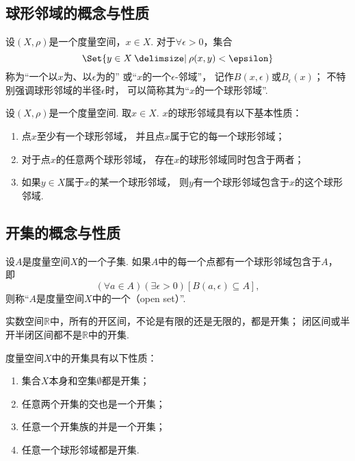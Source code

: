 \subsection{球形邻域的概念与性质}
\begin{definition}\label{definition:度量空间.球形邻域的概念}
设\((X,\rho)\)是一个度量空间，\(x \in X\).
对于\(\forall\epsilon>0\)，集合\[
	\Set{ y \in X \given \rho(x,y) < \epsilon }
\]
称为“一个以\(x\)为、以\(\epsilon\)为的”
或“\(x\)的一个\(\epsilon\)-邻域”，
记作\(B(x,\epsilon)\)或\(B_{\epsilon}(x)\)；
不特别强调球形邻域的半径\(\epsilon\)时，
可以简称其为“\(x\)的一个球形邻域”.
\end{definition}

\begin{theorem}\label{theorem:度量空间.球形邻域的性质}
设\((X,\rho)\)是一个度量空间.
取\(x \in X\).
\(x\)的球形邻域具有以下基本性质：
\begin{enumerate}
	\item 点\(x\)至少有一个球形邻域，
	并且点\(x\)属于它的每一个球形邻域；
	\item 对于点\(x\)的任意两个球形邻域，
	存在\(x\)的球形邻域同时包含于两者；
	\item 如果\(y \in X\)属于\(x\)的某一个球形邻域，
	则\(y\)有一个球形邻域包含于\(x\)的这个球形邻域.
\end{enumerate}
\end{theorem}

\subsection{开集的概念与性质}
\begin{definition}\label{definition:度量空间.开集的概念}
设\(A\)是度量空间\(X\)的一个子集.
如果\(A\)中的每一个点都有一个球形邻域包含于\(A\)，
即\[
	(\forall a \in A)
	(\exists\epsilon>0)
	[B(a,\epsilon) \subseteq A],
\]
则称“\(A\)是度量空间\(X\)中的一个（open set）”.
\end{definition}

\begin{example}
实数空间\(\mathbb{R}\)中，所有的开区间，不论是有限的还是无限的，都是开集；
闭区间或半开半闭区间都不是\(\mathbb{R}\)中的开集.
\end{example}

\begin{theorem}\label{theorem:度量空间.开集的性质}
度量空间\(X\)中的开集具有以下性质：
\begin{enumerate}
\item 集合\(X\)本身和空集\(\emptyset\)都是开集；
\item 任意两个开集的交也是一个开集；
\item 任意一个开集族的并是一个开集；
\item 任意一个球形邻域都是开集.
\end{enumerate}
\end{theorem}

